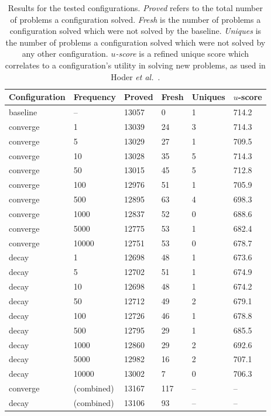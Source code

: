 \documentclass{llncs}
\begin{document}
\begin{table}
	\caption{
Results for the tested configurations.
\emph{Proved} refers to the total number of problems a configuration solved.
\emph{Fresh} is the number of problems a configuration solved which were not solved by the baseline.
\emph{Uniques} is the number of problems a configuration solved which were not solved by any other configuration.
\emph{\(u\)-score} is a refined unique score which correlates to a configuration's utility in solving new problems, as used in Hoder \emph{et al.}~\cite{u-score}.
	}
	\centering
	\begin{tabular}{l l l l l l}
		Configuration & Frequency & Proved & Fresh & Uniques & \(u\)-score\\
		\hline
		baseline & -- & 13057 & 0 & 1 & 714.2\\
		converge & 1 & 13039 & 24 & 3 & 714.3\\
		converge & 5 & 13029 & 27 & 1 & 709.5\\
		converge & 10 & 13028 & 35 & 5 & 714.3\\
		converge & 50 & 13015 & 45 & 5 & 712.8\\
		converge & 100 & 12976 & 51 & 1 & 705.9\\
		converge & 500 & 12895 & 63 & 4 & 698.3\\
		converge & 1000 & 12837 & 52 & 0 & 688.6\\
		converge & 5000 & 12775 & 53 & 1 & 682.4\\
		converge & 10000 & 12751 & 53 & 0 & 678.7\\
		decay & 1 & 12698 & 48 & 1 & 673.6\\
		decay & 5 & 12702 & 51 & 1 & 674.9\\
		decay & 10 & 12698 & 48 & 1 & 674.2\\
		decay & 50 & 12712 & 49 & 2 & 679.1\\
		decay & 100 & 12726 & 46 & 1 & 678.8\\
		decay & 500 & 12795 & 29 & 1 & 685.5\\
		decay & 1000 & 12860 & 29 & 2 & 692.6\\
		decay & 5000 & 12982 & 16 & 2 & 707.1\\
		decay & 10000 & 13002 & 7 & 0 & 706.3\\
		\hline
		converge & (combined) & 13167 & 117 & -- & --\\
		decay & (combined) & 13106 & 93 & -- & --\\
	\end{tabular}
	\label{tab:results}
\end{table}
\end{document}
